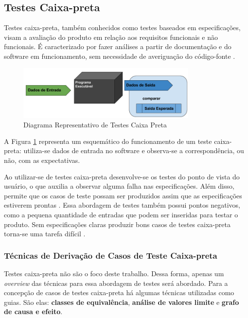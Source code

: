 \subsection{Testes Caixa-preta}
Testes caixa-preta, também conhecidos como testes baseados em especificações, visam a avaliação do produto em relação aos requisitos funcionais e não funcionais. É caracterizado por fazer análises a partir de documentação e do software em funcionamento, sem necessidade de averiguação do código-fonte \cite{barbosaEtAl2009}.

\begin{figure}[h]
  \centering
    \includegraphics[width=0.8\textwidth]{figuras/test_black_box.png}
    \caption{Diagrama Representativo de Testes Caixa Preta}
    \label{test_black_box}
\end{figure}

A Figura \ref{test_black_box} representa um esquemático do funcionamento de um teste caixa-preta: utiliza-se dados de entrada no software e observa-se a correspondência, ou não, com as expectativas.
\par
\indent Ao utilizar-se de testes caixa-preta desenvolve-se os testes do ponto de vista do usuário, o que auxilia a observar alguma falha nas especificações. Além disso, permite que os casos de teste possam ser produzidos assim que as especificações estiverem prontas \cite{stf2010}. Essa abordagem de testes também possui pontos negativos, como a pequena quantidade de entradas que podem ser inseridas para testar o produto. Sem especificações claras produzir bons casos de testes caixa-preta torna-se uma tarefa difícil \cite{stf2010}.

\subsubsection{Técnicas de Derivação de Casos de Teste Caixa-preta}
Testes caixa-preta não são o foco deste trabalho. Dessa forma, apenas um \textit{overview} das técnicas para essa abordagem de testes será abordado. Para a concepção de casos de testes caixa-preta há algumas técnicas utilizadas como guias. São elas: \textbf{classes de equivalência}, \textbf{análise de valores limite} e \textbf{grafo de causa e efeito}.

